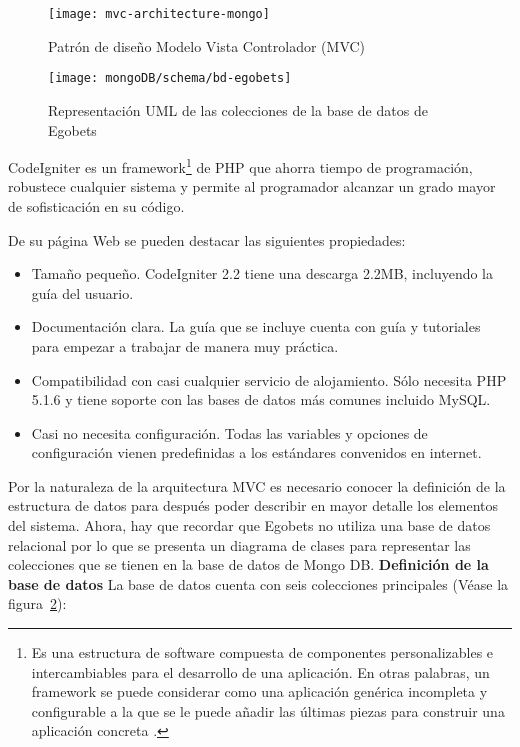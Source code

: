 \begin{figure}[!htb]\centering
   \begin {minipage}{1\textwidth}
     \texttt{[image: mvc-architecture-mongo]}
     \caption{Patrón de diseño Modelo Vista Controlador (MVC)}\label{Fig:mvc}
   \end{minipage}
\end{figure}

	\begin{figure}[!htb]\centering
	   \begin {minipage}{1\textwidth}
	     \texttt{[image: mongoDB/schema/bd-egobets]}
	     \caption{Representación UML de las colecciones de la base de datos de Egobets}\label{Fig:db-egobets}
	   \end{minipage}
	\end{figure}

CodeIgniter es un framework\footnote{Es una estructura de software compuesta de componentes personalizables e intercambiables para el desarrollo de una aplicación. En otras palabras, un framework se puede considerar como una aplicación genérica incompleta y configurable a la que se le puede añadir las últimas piezas para construir una aplicación concreta \cite{upton2007codeigniter}.} de PHP que ahorra tiempo de programación, robustece cualquier sistema y permite al programador alcanzar un grado mayor de sofisticación en su código.

	De su página Web \cite{codeigniterWeb} se pueden destacar las siguientes propiedades:
	\begin{itemize}
		\item Tamaño pequeño. CodeIgniter 2.2 tiene una descarga 2.2MB, incluyendo la guía del usuario.
		\item Documentación clara. La guía que se incluye cuenta con guía y tutoriales para empezar a trabajar de manera muy práctica.
		\item Compatibilidad con casi cualquier servicio de alojamiento. Sólo necesita PHP 5.1.6 y tiene soporte con las bases de datos más comunes incluido MySQL.

		\item Casi no necesita configuración. Todas las variables y opciones de configuración vienen predefinidas a los estándares convenidos en internet.

	\end{itemize}


	Por la naturaleza de la arquitectura MVC es necesario conocer la definición de la estructura de datos para después poder describir en mayor detalle los elementos del sistema. Ahora, hay que recordar que Egobets no utiliza una base de datos relacional por lo que se presenta un diagrama de clases para representar las colecciones que se tienen en la base de datos de Mongo DB.
	\textbf{Definición de la base de datos}
	La base de datos cuenta con seis colecciones principales (Véase la figura~\ref{Fig:db-egobets}):

